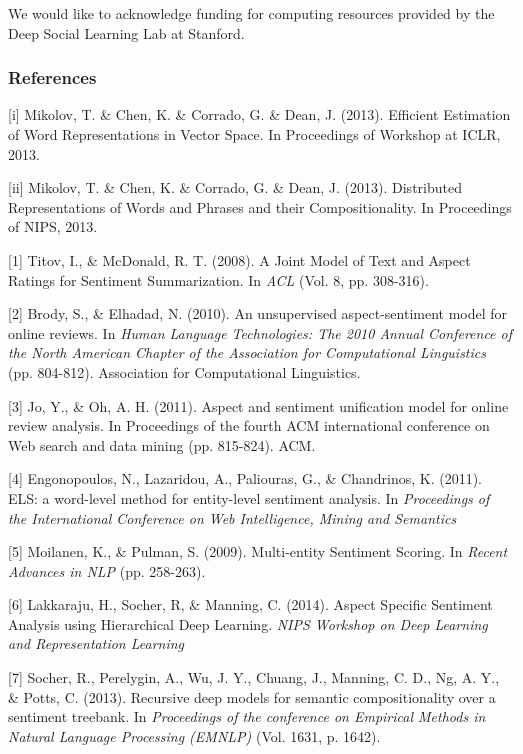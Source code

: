 \documentclass{article} %
\begin{document}
We would like to acknowledge funding for computing resources provided by the Deep Social Learning Lab at Stanford.

\subsubsection*{References} %

\small{

[i] Mikolov, T. \& Chen, K. \& Corrado, G. \& Dean, J. (2013). Efficient Estimation of Word Representations in Vector Space. In Proceedings of Workshop at ICLR, 2013.

[ii] Mikolov, T. \& Chen, K. \& Corrado, G. \& Dean, J. (2013). Distributed Representations of Words and Phrases and their Compositionality. In Proceedings of NIPS, 2013.

[1] Titov, I., \& McDonald, R. T. (2008). A Joint Model of Text and Aspect Ratings for Sentiment Summarization. In {\it ACL} (Vol. 8, pp. 308-316).

[2] Brody, S., \& Elhadad, N. (2010). An unsupervised aspect-sentiment model for online reviews. In {\it Human Language Technologies: The 2010 Annual Conference of the North American Chapter of the Association for Computational Linguistics} (pp. 804-812). Association for Computational Linguistics.

[3] Jo, Y., \& Oh, A. H. (2011). Aspect and sentiment unification model for online review analysis. In Proceedings of the fourth ACM international conference on Web search and data mining (pp. 815-824). ACM.


[4] Engonopoulos, N., Lazaridou, A., Paliouras, G., \& Chandrinos, K. (2011). ELS: a word-level method for entity-level sentiment analysis. In {\it Proceedings of the International Conference on Web Intelligence, Mining and Semantics}


[5] Moilanen, K., \& Pulman, S. (2009). Multi-entity Sentiment Scoring. In {\it Recent Advances in NLP} (pp. 258-263).


[6] Lakkaraju, H., Socher, R, \& Manning, C. (2014). Aspect Specific Sentiment Analysis using Hierarchical Deep Learning. {\it NIPS Workshop on Deep Learning and Representation Learning}

[7] Socher, R., Perelygin, A., Wu, J. Y., Chuang, J., Manning, C. D., Ng, A. Y., \& Potts, C. (2013). Recursive deep models for semantic compositionality over a sentiment treebank. In {\it Proceedings of the conference on Empirical Methods in Natural Language Processing (EMNLP)} (Vol. 1631, p. 1642).


}
\end{document}
